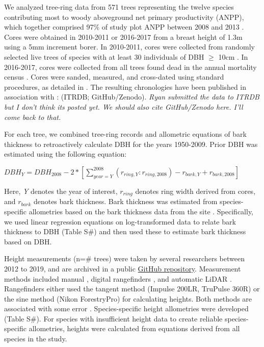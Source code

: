 \documentclass[]{article}
\begin{document}
We analyzed tree-ring data from 571 trees representing the twelve
species contributing most to woody aboveground net primary productivity
(ANPP), which together comprised 97\% of study plot ANPP between 2008
and 2013 \citep{helcoski_growing_2019}. Cores were obtained in 2010-2011
or 2016-2017 from a breast height of 1.3m using a 5mm increment borer.
In 2010-2011, cores were collected from randomly selected live trees of
species with at least 30 individuals of DBH \(\ge\) 10cm
\citep{bourg_initial_2013}. In 2016-2017, cores were collected from all
trees found dead in the annual mortality census
\citep{gonzalezakre_patterns_2016}. Cores were sanded, measured, and
cross-dated using standard procedures, as detailed in
\citep{helcoski_growing_2019}. The resulting chronologies have been
published in association with \citet{helcoski_growing_2019}: (ITRDB;
GitHub/Zenodo). \emph{Ryan submitted the data to ITRDB but I don't think
its posted yet. We should also cite GitHub/Zenodo here. I'll come back
to that.}

For each tree, we combined tree-ring records and allometric equations of
bark thickness to retroactively calculate DBH for the years 1950-2009.
Prior DBH was estimated using the following equation:

\(DBH_Y = DBH_{2008} - 2*\left[\sum_{year=Y}^{2008} (r_{ring, Y}:r_{ring,2008}) - r_{bark,Y} + r_{bark,2008}\right]\)

Here, \emph{Y} denotes the year of interest, \(r_{ring}\) denotes ring
width derived from cores, and \(r_{bark}\) denotes bark thickness. Bark
thickness was estimated from species-specific allometries based on the
bark thickness data from the site
\citep{andersonteixeira_size-related_2015}. Specifically, we used linear
regression equations on log-transformed data to relate bark thickness to
DBH (Table S\#) and then used these to estimate bark thickness based on
DBH.

Height measurements (n=\# trees) were taken by several researchers
between 2012 to 2019, and are archived in a public
\href{https://github.com/SCBI-ForestGEO/SCBI-ForestGEO-Data/tree/master/tree_dimensions/tree_heights}{GitHub
repository}. Measurement methods included manual
\citep[NEON]{stovall_assessing_2018}, digital rangefinders
\citep{andersonteixeira_size-related_2015}, and automatic LiDAR
\citep{stovall_terrestrial_2018}. Rangefinders either used the tangent
method (Impulse 200LR, TruPulse 360R) or the sine method (Nikon
ForestryPro) for calculating heights. Both methods are associated with
some error \citep{larjavaara_measuring_2013}. Species-specific height
allometries were developed (Table S\#). For species with insufficient
height data to create reliable species-specific allometries, heights
were calculated from equations derived from all species in the study.
\end{document}
